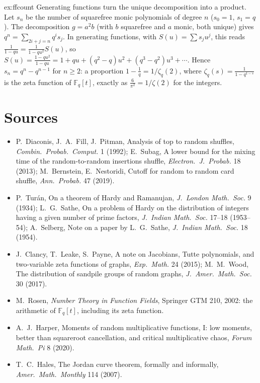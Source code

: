 \begin{solution}{ex:ffcount}
\idea Generating functions turn the unique decomposition into a product.
\writeup Let $s_n$ be the number of squarefree monic polynomials of degree $n$ ($s_0=1$, $s_1=q$). The decomposition $g=a^2b$ (with $b$ squarefree and $a$ monic, both unique) gives $q^n=\sum_{2i+j=n}q^is_j$. In generating functions, with $S(u)=\sum s_ju^j$, this reads $\frac1{1-qu}=\frac1{1-qu^2}S(u)$, so $S(u)=\frac{1-qu^2}{1-qu}=1+qu+(q^2-q)u^2+(q^3-q^2)u^3+\cdots$. Hence $s_n=q^n-q^{n-1}$ for $n\ge2$: a proportion $1-\frac1q=1/\zeta_q(2)$, where $\zeta_q(s)=\frac1{1-q^{1-s}}$ is the zeta function of $\mathbb F_q[t]$, exactly as $\frac6{\pi^2}=1/\zeta(2)$ for the integers.
\end{solution}

\section{Sources}

\begin{itemize}
\item P.~Diaconis, J.~A.~Fill, J.~Pitman, Analysis of top to random shuffles, \emph{Combin.\ Probab.\ Comput.} 1 (1992); E.~Subag, A lower bound for the mixing time of the random-to-random insertions shuffle, \emph{Electron.\ J.\ Probab.} 18 (2013); M.~Bernstein, E.~Nestoridi, Cutoff for random to random card shuffle, \emph{Ann.\ Probab.} 47 (2019).
\item P.~Tur\'an, On a theorem of Hardy and Ramanujan, \emph{J.\ London Math.\ Soc.} 9 (1934); L.~G.~Sathe, On a problem of Hardy on the distribution of integers having a given number of prime factors, \emph{J.\ Indian Math.\ Soc.} 17--18 (1953--54); A.~Selberg, Note on a paper by L.~G.~Sathe, \emph{J.\ Indian Math.\ Soc.} 18 (1954).
\item J.~Clancy, T.~Leake, S.~Payne, A note on Jacobians, Tutte polynomials, and two-variable zeta functions of graphs, \emph{Exp.\ Math.} 24 (2015); M.~M.~Wood, The distribution of sandpile groups of random graphs, \emph{J.\ Amer.\ Math.\ Soc.} 30 (2017).
\item M.~Rosen, \emph{Number Theory in Function Fields}, Springer GTM 210, 2002: the arithmetic of $\mathbb F_q[t]$, including its zeta function.
\item A.~J.~Harper, Moments of random multiplicative functions, I: low moments, better than squareroot cancellation, and critical multiplicative chaos, \emph{Forum Math.\ Pi} 8 (2020).
\item T.~C.~Hales, The Jordan curve theorem, formally and informally, \emph{Amer.\ Math.\ Monthly} 114 (2007).
\end{itemize}
